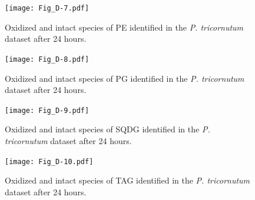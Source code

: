 \begin{figure}[!th]
\centering
\texttt{[image: Fig\_D-7.pdf]}
\caption[Oxidized and intact species of PE identified in the \emph{P. tricornutum} dataset after 24 hours]{Oxidized and intact species of PE identified in the \emph{P. tricornutum} dataset after 24 hours.}
\label{fig:adn7}
\end{figure}

\clearpage

\begin{figure}[!th]
\centering
\texttt{[image: Fig\_D-8.pdf]}
\caption[Oxidized and intact species of PG identified in the \emph{P. tricornutum} dataset after 24 hours]{Oxidized and intact species of PG identified in the \emph{P. tricornutum} dataset after 24 hours.}
\label{fig:adn8}
\end{figure}

\clearpage

\begin{figure}[!th]
\centering
\texttt{[image: Fig\_D-9.pdf]}
\caption[Oxidized and intact species of SQDG identified in the \emph{P. tricornutum} dataset after 24 hours]{Oxidized and intact species of SQDG identified in the \emph{P. tricornutum} dataset after 24 hours.}
\label{fig:adn9}
\end{figure}

\clearpage

\begin{figure}[!th]
\centering
\texttt{[image: Fig\_D-10.pdf]}
\caption[Oxidized and intact species of TAG identified in the \emph{P. tricornutum} dataset after 24 hours]{Oxidized and intact species of TAG identified in the \emph{P. tricornutum} dataset after 24 hours.}
\label{fig:adn10}
\end{figure}

\clearpage

